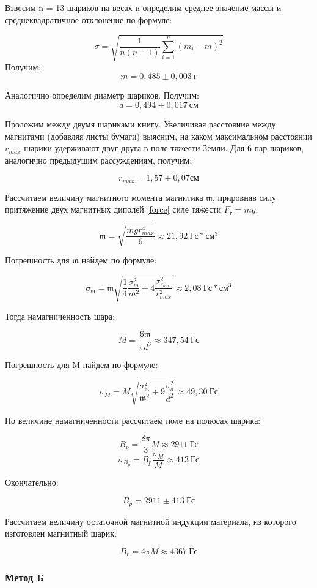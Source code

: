 \documentclass[a4paper,12pt]{article}
\begin{document}
Взвесим n = 13 шариков на весах и определим среднее значение массы и среднеквадратичное отклонение по формуле:

$$
	\sigma = \sqrt{\frac{1}{n(n-1)}\sum_{i=1}^n(m_i - m)^2}
$$
\vspace{0.5 cm}
Получим:
\vspace{0.0 cm}
$$
	m = 0,485 \pm 0,003 \ г
$$

Аналогично определим диаметр шариков. Получим:
$$
	d = 0,494 \pm 0,017 \ см 
$$

Проложим между двумя шариками книгу. Увеличивая расстояние между магнитами (добавляя листы бумаги) выясним,  на каком максимальном расстоянии $r_{max}$ шарики удерживают друг друга в поле тяжести Земли. Для 6 пар шариков, аналогично предыдущим рассуждениям, получим:

$$
	r_{max} = 1,57 \pm 0,07 см
$$

Рассчитаем величину магнитного момента магнитика $\mathfrak{m}$, прировняв силу притяжение двух магнитных диполей \eqref{force} силе тяжести $F_т = mg$:

$$
	\mathfrak{m} = \sqrt{\frac{mgr^4_{max}}{6}} \approx 21,92 \ Гс*см^3
$$

Погрешность для $\mathfrak{m}$ найдем по формуле:

$$
	\sigma_{\mathfrak{m}} = \mathfrak{m} \sqrt{ \frac{1}{4}  \frac{\sigma_m^2}{m^2} + 4 \frac{\sigma_{r_{max}} ^2}{r_{max}^2}} \approx 2,08 \ Гс*см^3
$$

Тогда намагниченность шара:

$$
	M = \frac{6\mathfrak{m}}{\pi d^3} \approx 347,54 \ Гс	
$$

Погрешность для M найдем по формуле:

$$
	\sigma_M = M\sqrt{\frac{\sigma_{\mathfrak{m}}^2}{\mathfrak{m}^2} + 9\frac{\sigma_d^2}{d^2}} \approx 49,30 \ Гс
$$

По величине намагниченности рассчитаем поле на полюсах шарика:

$$
	B_p = \frac{8\pi}{3}M \approx 2911 \ Гс
$$
$$	
	\sigma_{B_p} = B_p \frac{\sigma_M}{M} \approx 413 \ Гс
$$

Окончательно:

$$
	B_p = 2911 \pm 413 \ Гс
$$

\newpage

Рассчитаем величину остаточной магнитной индукции материала, из которого изготовлен магнитный шарик:

$$
	B_r = 4\pi M \approx 4367 \ Гс
$$


\subsubsection*{Метод Б}
\end{document}

